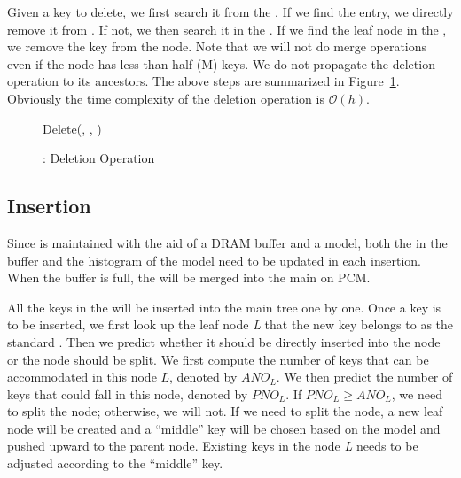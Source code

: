 Given a key to delete, we first search it from the \bplustree. If we find the entry, we directly remove it from \bplustree. If not, we then search it in the \bptree. If we find the leaf node in the \bptree, we remove the key from the node. Note that we will not do merge operations even if the node has less than half (M) keys. We do not propagate the deletion operation to its ancestors. The above steps are summarized in Figure~\ref{alg:deletion}. Obviously the time complexity of the deletion operation is $\mathcal{O}(h)$.



\begin{figure}[htup]
\linesnumbered
\begin{algorithm}[H]
\caption{Delete(\bplustree, \bptree, \key{})}
\KwIn{\bplustree, \bptree, \key{}}
\label{alg:alg2}
\end{algorithm}


\caption{\bptree: Deletion Operation}\label{alg:deletion}
\end{figure}


\subsection{Insertion}\label{sec:model:update:insertion}

Since \bptree is maintained with the aid of a DRAM buffer and a \predict model, both the \bplustree in the buffer and the histogram of the \predict model need to be updated in each insertion. When the buffer is full, the \bplustree will be merged into the main \bptree on PCM.


All the keys in the \bplustree will be inserted into the main tree one by one. Once a key is to be inserted, we first look up the leaf node \emph{L} that the new key belongs to as the standard \bplustree. Then we predict whether it should be directly inserted into the node or the node should be split. We first compute the number of keys that can be accommodated in this node $L$, denoted by $ANO_L$. We then predict the number of keys that could fall in this node, denoted by $PNO_L$. If $PNO_L\geq ANO_L$, we need to split the node; otherwise, we will not. If we need to split the node, a new leaf node will be created and a ``middle'' key will be chosen based on the \predict model and pushed upward to the parent node. Existing keys in the node \emph{L} needs to be adjusted according to the ``middle'' key.


